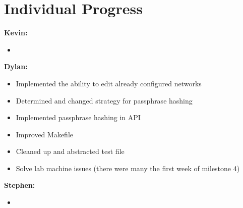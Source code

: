 \documentclass[11pt]{article}
\begin{document}
\section{Individual Progress}

\textbf{Kevin:}
\begin{itemize}
  \item
\end{itemize}

\textbf{Dylan:}
\begin{itemize}
  \item Implemented the ability to edit already configured networks
  \item Determined and changed strategy for passphrase hashing
  \item Implemented passphrase hashing in API
  \item Improved Makefile
  \item Cleaned up and abstracted test file
  \item Solve lab machine issues (there were many the first week of milestone 4)
\end{itemize}

\textbf{Stephen:}
\begin{itemize}
  \item
\end{itemize}
\end{document}
